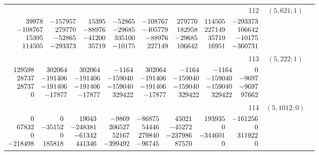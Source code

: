 \documentclass[11pt]{article}
\theoremstyle{remark}
\numberwithin{equation}{section}
\begin{document}
\begin{longtable}{rcl}
112 & $(5,621;1)$ & \begin{tabular}[t]{@{}l@{}}$w_i=\displaystyle \frac{293886947787454393}{108542691091493073210000000000000000}$\\[3pt]{\scriptsize$\begin{array}{@{}rrrrrrrr@{}}39978 & -157957 & 15395 & -52865 & -108767 & 279770 & 114505 & -293373\\-108767 & 279770 & -88976 & -29685 & -405779 & 182958 & 227149 & 106642\\15395 & -52865 & -41200 & 335100 & -88976 & -29685 & 35719 & -10175\\114505 & -293373 & 35719 & -10175 & 227149 & 106642 & 16951 & -360731\end{array}$}\end{tabular}\\[8pt]
113 & $(5,222;1)$ & \begin{tabular}[t]{@{}l@{}}$w_i=\displaystyle \frac{28258627022212189}{15207733184360847158000000000000000}$\\[3pt]{\scriptsize$\begin{array}{@{}rrrrrrrr@{}}129598 & 302064 & 302064 & -1164 & 302064 & -1164 & -1164 & 0\\28737 & -191406 & -191406 & -159040 & -191406 & -159040 & -159040 & -9697\\28737 & -191406 & -191406 & -159040 & -191406 & -159040 & -159040 & -9697\\0 & -17877 & -17877 & 329422 & -17877 & 329422 & 329422 & 97662\end{array}$}\end{tabular}\\[8pt]
114 & $(5,1012;0)$ & \begin{tabular}[t]{@{}l@{}}$w_i=\displaystyle \frac{15529849714389967}{20158207303631200000000000000000000}$\\[3pt]{\scriptsize$\begin{array}{@{}rrrrrrrr@{}}0 & 0 & 19043 & -9869 & -86875 & 45021 & 193935 & -161256\\67832 & -35152 & -248381 & 206527 & 54446 & -45272 & 0 & 0\\0 & 0 & -61342 & 52167 & 279840 & -237986 & -344601 & 311922\\-218498 & 185818 & 441346 & -399492 & -96745 & 87570 & 0 & 0\end{array}$}\end{tabular}\\[8pt]

\end{longtable}
\end{document}

